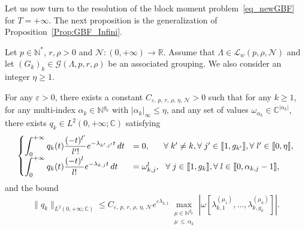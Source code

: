 \documentclass[10pt]{amsart}
\theoremstyle{definition}\newtheorem{defi}[theo]{Definition}\newtheorem{rema}[theo]{Remark}\newtheorem{exam}[theo]{Example}\newtheorem{exem}[theo]{Example}\newtheorem{nota}[theo]{Notation}
\newcommand{\llbracket}{\mathopen{[\mkern -2.7mu[}}
\newcommand{\rrbracket}{\mathclose{]\mkern -2.7mu]}}
\newcommand{\inter}[2]{\llbracket #1,#2 \rrbracket}
\newcommand{\n}{g}
\newcommand{\LL}{\mathcal{L}}
\newcommand{\NN}{\mathcal{N}}
\newcommand{\N}{\mathbb{N}}
\newcommand{\R}{\mathbb{R}}
\newcommand{\C}{\mathbb{C}}
\let\oldforall\forall
\renewcommand*{\forall}{\mathrel{\oldforall}}
\begin{document}
Let us now turn to the resolution of the block moment problem~\eqref{eq_newGBF} for $T=+\infty$. The next proposition is the generalization of Proposition~\ref{Prop:GBF_Infini}.

\begin{prop}\label{Prop:newGBF_Infini}
Let $p \in \N^*$, $r, \rho > 0$ and $\NN : (0,+\infty) \to \R$. Assume that $\Lambda \in \LL_w(p,\rho, \NN)$ and let $(G_k)_k\in \mathcal{G}(\Lambda,p,r,\rho)$ be an associated grouping. We also consider an integer $\eta\geq 1$.

For any $\varepsilon > 0$, there exists a constant $C_{\varepsilon,\, p, \,r, \,\rho,\, \eta,\, \NN} >0$ such that for any $k \geq 1$, for any multi-index $\alpha_k\in \N^{\n_k}$ with $|\alpha_k|_\infty\leq \eta$, and any set of values $\omega_{\alpha_k} \in \C^{|\alpha_k|}$, there exists $q_k \in L^2(0,+\infty; \C)$ satisfying
\begin{equation*}\label{eq_newGBF_Infini}
\begin{cases}
\displaystyle\int_0^{+\infty} q_k(t) \frac{(-t)^{l'}}{l'!} e^{-\lambda_{k',j'}t} \, dt & = 0, \mkern30mu \forall k'\neq k, \forall j'\in \inter{1}{\n_{k'}}, \forall l'\in \inter{0}{\eta},\\[0.15em]
\displaystyle\int_0^{+\infty} q_k(t) \frac{(-t)^l}{l!} e^{-\lambda_{k,j}t} \, dt & = \omega_{k,j}^l, \ \ \forall j\in \inter{1}{\n_{k}}, \forall l\in \inter{0}{\alpha_{k,j}-1},\\
\end{cases}
\end{equation*}
and the bound
\begin{equation}\label{bound_qk_multiplicities_Infini}
\|q_k\|_{L^2(0,+\infty;\C)}\leq C_{\varepsilon,\, p,\, r,\, \rho,\, \eta,\, \NN} e^{\varepsilon \lambda_{k,1}} \max\limits_{\substack{\mu\in \N^{\n_k} \\ \mu\,\leq\,\alpha_k}} \left| \omega\left[\lambda_{k,1}^{(\mu_1)},\dotsc,\lambda_{k,\n_k}^{(\mu_k)}\right] \right|.
\end{equation}
\end{prop}
\end{document}
